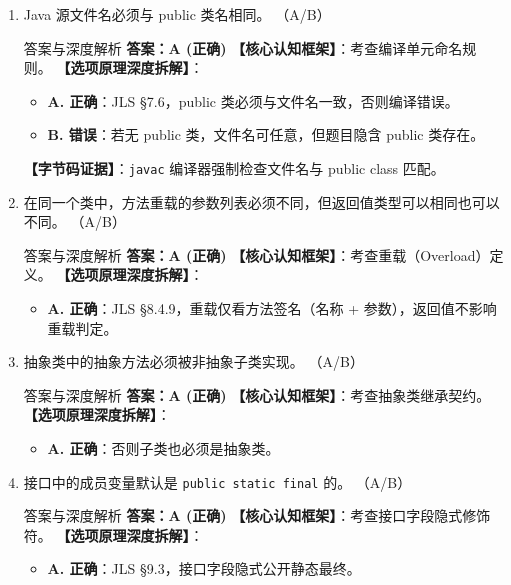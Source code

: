 ﻿\documentclass[12pt, a4paper]{ctexart}
\newcommand{\code}[1]{\texttt{#1}}
\begin{document}
\begin{enumerate}[label=\arabic*., itemsep=1.5em]
	\item Java 源文件名必须与 public 类名相同。 \underline{\hspace{1cm}}（A/B）
	      \begin{bluebox}{答案与深度解析}
		      \textbf{答案：A (正确)}
		      \textbf{【核心认知框架】}：考查编译单元命名规则。
		      \textbf{【选项原理深度拆解】}：
		      \begin{itemize}[leftmargin=*, nosep]
			      \item \textbf{A. 正确}：JLS §7.6，public 类必须与文件名一致，否则编译错误。
			      \item \textbf{B. 错误}：若无 public 类，文件名可任意，但题目隐含 public 类存在。
		      \end{itemize}
		      \textbf{【字节码证据】}：\code{javac} 编译器强制检查文件名与 public class 匹配。
	      \end{bluebox}

	\item 在同一个类中，方法重载的参数列表必须不同，但返回值类型可以相同也可以不同。 \underline{\hspace{1cm}}（A/B）
	      \begin{bluebox}{答案与深度解析}
		      \textbf{答案：A (正确)}
		      \textbf{【核心认知框架】}：考查重载（Overload）定义。
		      \textbf{【选项原理深度拆解】}：
		      \begin{itemize}[leftmargin=*, nosep]
			      \item \textbf{A. 正确}：JLS §8.4.9，重载仅看方法签名（名称 + 参数），返回值不影响重载判定。
		      \end{itemize}
	      \end{bluebox}

	\item 抽象类中的抽象方法必须被非抽象子类实现。 \underline{\hspace{1cm}}（A/B）
	      \begin{bluebox}{答案与深度解析}
		      \textbf{答案：A (正确)}
		      \textbf{【核心认知框架】}：考查抽象类继承契约。
		      \textbf{【选项原理深度拆解】}：
		      \begin{itemize}[leftmargin=*, nosep]
			      \item \textbf{A. 正确}：否则子类也必须是抽象类。
		      \end{itemize}
	      \end{bluebox}

	\item 接口中的成员变量默认是 \code{public static final} 的。 \underline{\hspace{1cm}}（A/B）
	      \begin{bluebox}{答案与深度解析}
		      \textbf{答案：A (正确)}
		      \textbf{【核心认知框架】}：考查接口字段隐式修饰符。
		      \textbf{【选项原理深度拆解】}：
		      \begin{itemize}[leftmargin=*, nosep]
			      \item \textbf{A. 正确}：JLS §9.3，接口字段隐式公开静态最终。
		      \end{itemize}
	      \end{bluebox}


\end{enumerate}
\end{document}
